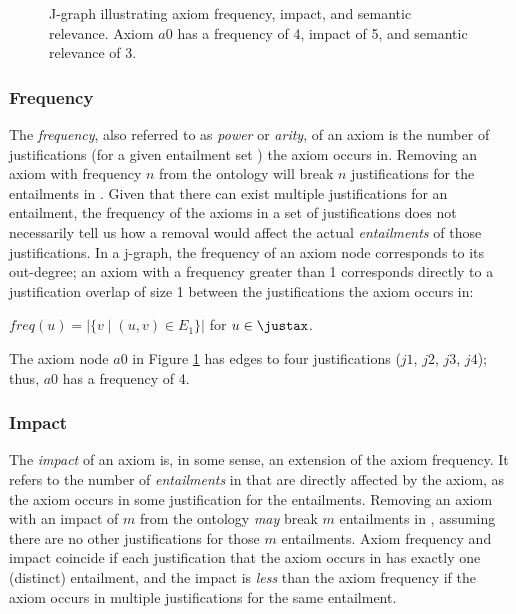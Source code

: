 \begin{figure}
\centering
{}
\caption[J-graph illustrating axiom frequency, impact, semantic relevance.]{J-graph illustrating axiom frequency, impact, and semantic relevance. Axiom $a0$ has a frequency of 4, impact of 5, and semantic relevance of 3.} \label{fig:jgraph-arity}
\end{figure}

\subsubsection{Frequency}

The \emph{frequency}, also referred to as \emph{power} or \emph{arity}, of an axiom is the number of justifications (for a given entailment set \entset) the axiom occurs in. Removing an axiom with frequency $n$ from the ontology will break $n$ justifications for the entailments in \entset. Given that there can exist multiple justifications for an entailment, the frequency of the axioms in a set of justifications does not necessarily tell us how a removal would affect the actual \emph{entailments} of those justifications. In a j-graph, the frequency of an axiom node corresponds to its out-degree; an axiom with a frequency greater than 1 corresponds directly to a justification overlap of size 1 between the justifications the axiom occurs in:
\begin{defn}[Frequency]
$freq(u) =  \left|\lbrace v \mid  (u, v) \in E_{1}\rbrace \right|$ for $u \in \justax$.
\end{defn}
The axiom node $a0$ in Figure \ref{fig:jgraph-arity} has edges to four justifications ($j1$, $j2$, $j3$, $j4$); thus, $a0$ has a frequency of 4.

\subsubsection{Impact}

The \emph{impact} of an axiom is, in some sense, an extension of the axiom frequency. It refers to the number of \emph{entailments} in \entset that are directly affected by the axiom, as the axiom occurs in some justification for the entailments. Removing an axiom with an impact of $m$ from the ontology \emph{may} break $m$ entailments in \entset, assuming there are no other justifications for those $m$ entailments. Axiom frequency and impact coincide if each justification that the axiom occurs in has exactly one (distinct) entailment, and the impact is \emph{less} than the axiom frequency if the axiom occurs in multiple justifications for the same entailment. 

